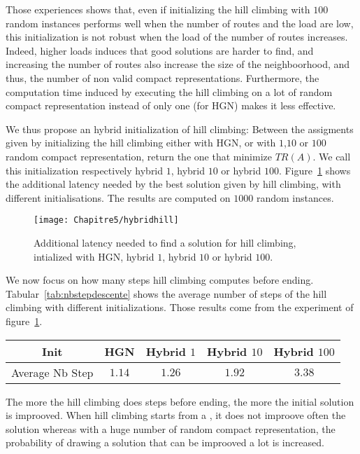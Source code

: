 Those experiences shows that, even if initializing the hill climbing with $100$ random instances performs well when the number of routes and the load are low, this initialization is not robust when the load of the number of routes increases. Indeed, higher loads induces that good solutions are harder to find, and increasing the number of routes also increase the size of the neighboorhood, and thus, the number of non valid compact representations. Furthermore, the computation time induced by executing the hill climbing on a lot of random compact representation instead of only one (for HGN) makes it less effective.


We thus propose an hybrid initialization of hill climbing: Between the assigments given by initializing the hill climbing either with HGN, or with $1$,$10$ or $100$ random compact representation, return the one that minimize $TR(A)$. We call this initialization respectively hybrid $1$, hybrid $10$ or hybrid $100$.
Figure~\ref{fig:hybridhill} shows the additional latency needed by the best solution given by hill climbing, with different initialisations. The results are computed on $1000$ random instances.
\begin{figure}[h]
	\centering
	\texttt{[image: Chapitre5/hybridhill]}
\caption{ Additional latency needed to find a solution for hill climbing, intialized with HGN, hybrid $1$, hybrid $10$ or hybrid $100$.}
\label{fig:hybridhill}
\end{figure}

We now focus on how many steps hill climbing computes before ending. Tabular~\ref{tab:nbstepdescente} shows the average number of steps of the hill climbing with different initializations. Those results come from the experiment of figure~\ref{fig:hybridhill}.

\begin{tabular}{ |c|c|c|c|c| }
\hline
    Init & HGN& Hybrid $1$& Hybrid $10$& Hybrid $100$\\
    \hline
    Average Nb Step & $1.14$ & $1.26$& $1.92$&$3.38$ \\

    \hline
 \end{tabular}
 \label{tab:nbstepdescente}

 The more the hill climbing does steps before ending, the more the initial solution is improoved. When hill climbing starts from a \hybridgreedynormalized, it does not improove often the solution whereas with a huge number of random compact representation, the probability of drawing a solution that can be improoved a lot is increased.
 
